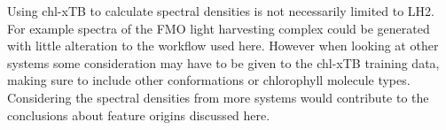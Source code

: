 Using chl-xTB to calculate spectral densities is not necessarily limited to LH2.
For example spectra of the FMO light harvesting complex could be generated with
little alteration to the workflow used here. However when looking at other systems 
some consideration may have to be given to the chl-xTB training data, making sure
to include other conformations or chlorophyll molecule types. Considering the spectral
densities from more systems would contribute to the conclusions about feature origins
discussed here.